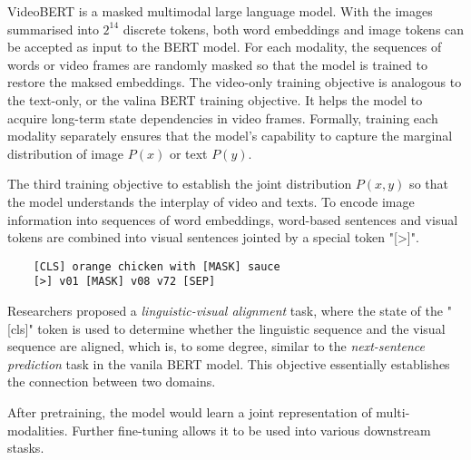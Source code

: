 \documentclass[11pt]{article}
\begin{document}
VideoBERT is a masked multimodal large language model. With the images summarised into $2^14$ discrete tokens, both word embeddings and image tokens can be accepted as input to the BERT model. For each modality, the sequences of words or video frames are randomly masked so that the model is trained to restore the maksed embeddings. The video-only training objective is analogous to the text-only, or the valina BERT training objective. It helps the model to acquire long-term state dependencies in video frames. Formally, training each modality separately ensures that the model's capability to capture the marginal distribution of image $P(x)$ or text $P(y)$.

The third training objective to establish the joint distribution $P(x,y)$ so that the model understands the interplay of video and texts. To encode image information into sequences of word embeddings, word-based sentences and visual tokens are combined into visual sentences jointed by a special token "[>]".
\begin{verbatim}
    [CLS] orange chicken with [MASK] sauce 
    [>] v01 [MASK] v08 v72 [SEP]
\end{verbatim}
Researchers proposed a \textit{linguistic-visual alignment} task, where the state of the "[cls]" token is used to determine whether the linguistic sequence and the visual sequence are aligned, which is, to some degree, similar to the \textit{next-sentence prediction} task in the vanila BERT model. This objective essentially establishes the connection between two domains. 

After pretraining, the model would learn a joint representation of multi-modalities. Further fine-tuning allows it to be used into various downstream stasks.
\end{document}
